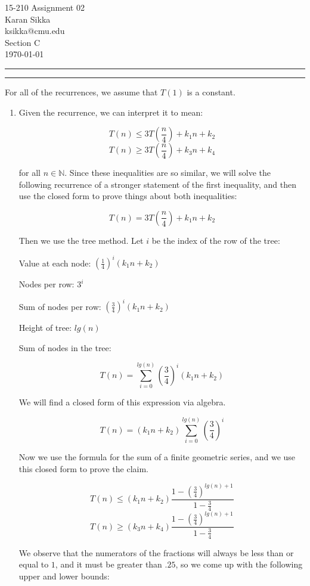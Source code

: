 \documentclass[11pt,letterpaper]{article}
\makeatletter
\newcommand{\question}[2] {\vspace{.25in} \hrule\vspace{0.5em}
\noindent{\bf #1: #2} \vspace{0.5em}
\hrule \vspace{.10in}}
\newcommand{\myname}{Karan Sikka}
\newcommand{\myandrew}{ksikka@cmu.edu}
\newcommand{\myhwnum}{02}
\makeatother
\begin{document}
\medskip

\thispagestyle{plain}
\begin{center}                  %
{\Large 15-210 Assignment \myhwnum} \\
\myname \\
\myandrew \\
Section C\\
\today\\
\end{center}


\question{1}{Task 4.1}
For all of the recurrences, we assume that $T(1)$ is a constant.
\begin{enumerate}
\item
Given the recurrence, we can interpret it to mean:

$$ T(n) \leq 3 T(\frac{n}{4}) + k_{1}n + k_{2}$$
$$ T(n) \geq 3 T(\frac{n}{4}) + k_{3}n + k_{4}$$

for all $n \in \mathbb{N}$. Since these inequalities are so similar,
we will solve the following recurrence of a stronger statement of the
first inequality, and then use the closed form
to prove things about both inequalities:

$$ T(n) = 3 T(\frac{n}{4}) + k_{1}n + k_{2}$$
  
Then we use the tree method. Let $i$ be the index of the row of
the tree:

Value at each node:
$ (\frac{1}{4})^{i} (k_1n + k_2)$

Nodes per row: $ 3^i $

Sum of nodes per row: $ (\frac{3}{4})^i (k_1n + k_2) $

Height of tree: $lg (n)$

Sum of nodes in the tree:

$$ T(n) = \sum_{i=0}^{lg(n)} (\frac{3}{4})^{i} (k_1n + k_2) $$

We will find a closed form of this expression via algebra.

$$ T(n) = (k_1n + k_2) \sum_{i=0}^{lg(n)} (\frac{3}{4})^{i} $$

Now we use the formula for the sum of a finite geometric series,
and we use this closed form to prove the claim.

$$ T(n) \leq (k_1n + k_2) \frac{1-(\frac{3}{4})^{lg(n)+1}}{1-\frac{3}{4}} $$
$$ T(n) \geq (k_3n + k_4) \frac{1-(\frac{3}{4})^{lg(n)+1}}{1-\frac{3}{4}} $$

We observe that the numerators of the fractions will always be less than or equal to $1$, and it 
must be greater than $.25$, so we come up with the following upper and lower bounds:


\end{enumerate}
\end{document}
